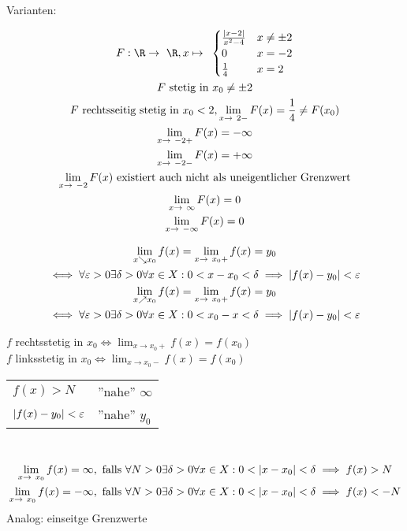 Varianten:\\
\begin{bsp*}
	\begin{gather*}
		F: \R \rightarrow \R , x \mapsto \begin{cases}
			\frac{\abs{x-2}}{x^2-4}	&x \neq \pm 2	\\
			0					&x = -2		\\
			\frac{1}{4}				&x = 2		
		\end{cases}\\
		F \text{ stetig in } x_0 \neq \pm 2 \\
		F \text{ rechtsseitig stetig in } x_0 < 2 , \lim_{x \rightarrow 2 -} F(x) = \frac{1}{4} \neq F(x_0) \\
		\lim_{x \rightarrow -2 +} F(x) = -\infty \\
		\lim_{x \rightarrow -2 -} F(x) = +\infty \\
		\lim_{x \rightarrow -2} F(x) \text{ existiert auch nicht als uneigentlicher Grenzwert} \\
		\lim_{x \rightarrow \infty} F(x) = 0 \\
		\lim_{x \rightarrow -\infty} F(x) = 0
	\end{gather*}
\end{bsp*}
\begin{def*}[note = Einseitige Grenzwerte , index = Grenzwert!einseitiger]
	\begin{gather*}
		\lim_{x \searrow x_0} f(x) = \lim_{x \rightarrow x_0 +} f(x) = y_0 \\
		\iff \forall \epsilon > 0 \exists \delta > 0 \forall x \in X : 0 < x - x_0 < \delta \implies \abs{f(x) - y_0} < \epsilon \\
		\lim_{x \nearrow x_0} f(x) = \lim_{x \rightarrow x_0 +} f(x) = y_0 \\
		\iff \forall \epsilon > 0 \exists \delta > 0 \forall x \in X : 0 < x_0 - x < \delta \implies \abs{f(x) - y_0} < \epsilon
	\end{gather*}
\end{def*}
\begin{bem}
	$f$ rechtsstetig in $x_0 \iff \lim_{x \rightarrow x_0 +} f(x) = f(x_0)$ \\
	$f$ linksstetig in $x_0 \iff \lim_{x \rightarrow x_0 -} f(x) = f(x_0)$
\end{bem}
\begin{def*}[note = uneigentlicher Grenzwert , index = Grenzwert!uneigentlicher]
	\begin{tabular}{ll}
		$f(x) > N$					&''nahe'' $\infty$	\\
		$\abs{f(x) - y_0} < \varepsilon$	&''nahe'' $y_0$	
	\end{tabular}\\
	\begin{gather*}
		\lim_{x \rightarrow x_0} f(x) = \infty, \text{ falls } \forall N > 0 \exists \delta > 0 \forall x \in X : 0 < \abs{x-x_0} < \delta \implies f(x) > N \\
		\lim_{x \rightarrow x_0} f(x) = -\infty, \text{ falls } \forall N > 0 \exists \delta > 0 \forall x \in X : 0 < \abs{x-x_0} < \delta \implies f(x) < -N \\
	\end{gather*}
	Analog: einseitge Grenzwerte
\end{def*}
